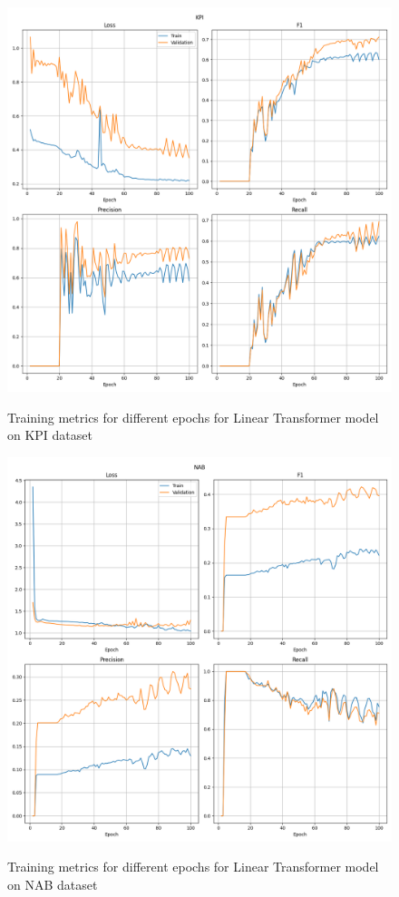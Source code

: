 \documentclass[a4paper, twoside]{report}
\theoremstyle{definition}
\numberwithin{equation}{section}
\begin{document}
\begin{figure}[h!]
    \centering
    \caption{Training metrics for different epochs for Linear Transformer model on KPI dataset}
    \includegraphics[width=\textwidth]{plots/LinearTransformer_KPI.png}
    \label{fig:LinearTransformer_KPI_training}
\end{figure}

\begin{figure}[h!]
    \centering
    \caption{Training metrics for different epochs for Linear Transformer model on NAB dataset}
    \includegraphics[width=\textwidth]{plots/LinearTransformer_NAB.png}
    \label{fig:LinearTransformer_NAB_training}
\end{figure}
\end{document}
